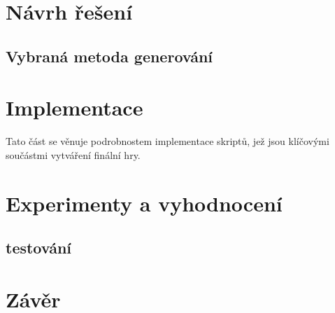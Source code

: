 \chapter{Návrh řešení}
\label{solution}
\textcolor{gray}{\blindtext[2]}
\textcolor{gray}{\blindtext[46]}

\section{Vybraná metoda generování}
\textcolor{gray}{\blindtext[46]}

\chapter{Implementace}
\label{implementace}
Tato část se věnuje podrobnostem implementace skriptů, jež jsou klíčovými součástmi vytváření finální hry.
\textcolor{gray}{\blindtext[60]}
\chapter{Experimenty a vyhodnocení}
\label{experiments}
\section{testování}
\label{tests}
\textcolor{gray}{\blindtext[30]}

\chapter{Závěr}
\label{end}
\textcolor{gray}{\blindtext[4]}